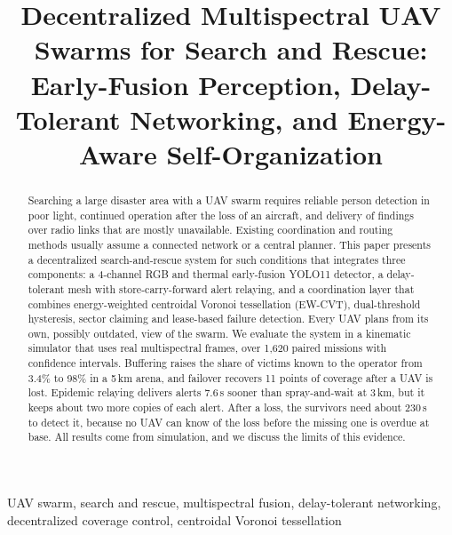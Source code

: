 \documentclass[conference]{IEEEtran}
\begin{document}
\title{Decentralized Multispectral UAV Swarms for Search and Rescue: Early-Fusion Perception, Delay-Tolerant Networking, and Energy-Aware Self-Organization}

\author{
}

\maketitle

\begin{abstract}
Searching a large disaster area with a UAV swarm requires reliable person detection in poor light, continued operation after the loss of an aircraft, and delivery of findings over radio links that are mostly unavailable. Existing coordination and routing methods usually assume a connected network or a central planner. This paper presents a decentralized search-and-rescue system for such conditions that integrates three components: a 4-channel RGB and thermal early-fusion YOLO11 detector, a delay-tolerant mesh with store-carry-forward alert relaying, and a coordination layer that combines energy-weighted centroidal Voronoi tessellation (EW-CVT), dual-threshold hysteresis, sector claiming and lease-based failure detection. Every UAV plans from its own, possibly outdated, view of the swarm. We evaluate the system in a kinematic simulator that uses real multispectral frames, over 1{,}620 paired missions with confidence intervals. Buffering raises the share of victims known to the operator from 3.4\% to 98\% in a 5\,km arena, and failover recovers 11 points of coverage after a UAV is lost. Epidemic relaying delivers alerts 7.6\,s sooner than spray-and-wait at 3\,km, but it keeps about two more copies of each alert. After a loss, the survivors need about 230\,s to detect it, because no UAV can know of the loss before the missing one is overdue at base. All results come from simulation, and we discuss the limits of this evidence.
\end{abstract}

\begin{IEEEkeywords}
UAV swarm, search and rescue, multispectral fusion, delay-tolerant networking, decentralized coverage control, centroidal Voronoi tessellation
\end{IEEEkeywords}
\end{document}
